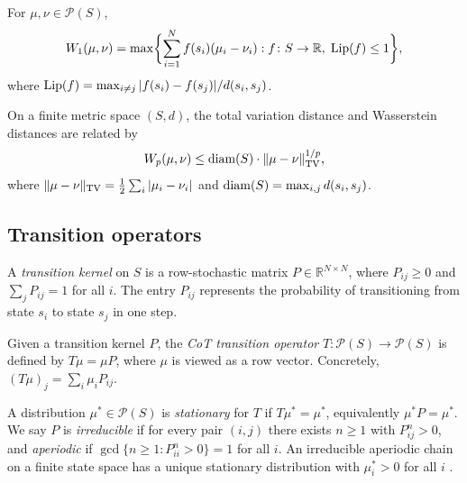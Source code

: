 \begin{theorem}
\label{thm:KR}
For $\mu, \nu \in \mathcal{P}(S)$,
\begin{equation}\label{eq:KR}
  W_1(\mu, \nu) = \max \biggl\{ \sum_{i=1}^N f(s_i)(\mu_i - \nu_i) :
  f \colon S \to \mathbb{R}, \; \mathrm{Lip}(f) \le 1 \biggr\},
\end{equation}
where $\mathrm{Lip}(f) = \max_{i \ne j} |f(s_i) - f(s_j)| / d(s_i, s_j)$.
\end{theorem}

\begin{remark}\label{rem:TV_W}
On a finite metric space $(S, d)$, the total variation distance and
Wasserstein distances are related by
\begin{equation}\label{eq:TV_W}
  W_p(\mu, \nu) \le \mathrm{diam}(S) \cdot \|\mu - \nu\|_{\mathrm{TV}}^{1/p},
\end{equation}
where $\|\mu - \nu\|_{\mathrm{TV}} = \tfrac{1}{2} \sum_i |\mu_i - \nu_i|$ and
$\mathrm{diam}(S) = \max_{i,j} d(s_i, s_j)$.
\end{remark}

\subsection{Transition operators}

\begin{definition}\label{def:kernel}
A \emph{transition kernel} on $S$ is a row-stochastic matrix
$P \in \mathbb{R}^{N \times N}$, where $P_{ij} \ge 0$ and
$\sum_j P_{ij} = 1$ for all $i$. The entry $P_{ij}$ represents the
probability of transitioning from state $s_i$ to state $s_j$ in one step.
\end{definition}

\begin{definition}\label{def:operator}
Given a transition kernel $P$, the \emph{CoT transition operator}
$T \colon \mathcal{P}(S) \to \mathcal{P}(S)$ is defined by
$T\mu = \mu P$, where $\mu$ is viewed as a row vector. Concretely,
$(T\mu)_j = \sum_i \mu_i P_{ij}$.
\end{definition}

A distribution $\mu^* \in \mathcal{P}(S)$ is \emph{stationary} for $T$ if
$T\mu^* = \mu^*$, equivalently $\mu^* P = \mu^*$. We say $P$ is
\emph{irreducible} if for every pair $(i, j)$ there exists $n \ge 1$ with
$P^n_{ij} > 0$, and \emph{aperiodic} if $\gcd\{n \ge 1 : P^n_{ii} > 0\} = 1$
for all $i$. An irreducible aperiodic chain on a finite state space has a
unique stationary distribution with $\mu^*_i > 0$ for all $i$
\cite{levin2009markov}.

